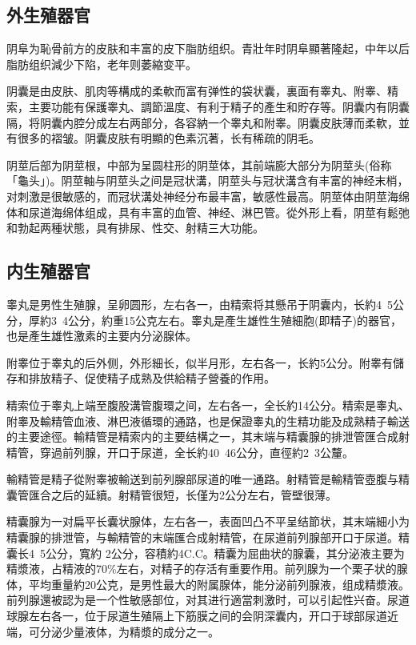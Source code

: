 \documentclass[12pt,UTF8]{ctexbook}
\begin{document}
\subsection{外生殖器官}

阴阜为恥骨前方的皮肤和丰富的皮下脂肪组织。青壯年时阴阜顯著隆起，中年以后脂肪组织減少下陷，老年则萎縮变平。

阴囊是由皮肤、肌肉等構成的柔軟而富有弹性的袋状囊，裏面有睾丸、附睾、精索，主要功能有保護睾丸、調節溫度、有利于精子的產生和貯存等。阴囊内有阴囊隔，将阴囊内腔分成左右两部分，各容納一个睾丸和附睾。阴囊皮肤薄而柔軟，並有很多的褶皱。阴囊皮肤有明顯的色素沉著，长有稀疏的阴毛。

阴莖后部为阴莖根，中部为呈圆柱形的阴莖体，其前端膨大部分为阴莖头(俗称「龜头」)。阴莖軸与阴莖头之间是冠状溝，阴莖头与冠状溝含有丰富的神经末梢，对刺激是很敏感的，而冠状溝处神经分布最丰富，敏感性最高。阴莖体由阴莖海绵体和尿道海绵体组成，具有丰富的血管、神经、淋巴管。從外形上看，阴莖有鬆弛和勃起两種状態，具有排尿、性交、射精三大功能。

\subsection{内生殖器官}

睾丸是男性生殖腺，呈卵圆形，左右各一，由精索将其懸吊于阴囊内，长約4~5公分，厚約3~4公分，約重15公克左右。睾丸是產生雄性生殖細胞(即精子)的器官，也是產生雄性激素的主要内分泌腺体。

附睾位于睾丸的后外侧，外形細长，似半月形，左右各一，长約5公分。附睾有儲存和排放精子、促使精子成熟及供給精子營養的作用。

精索位于睾丸上端至腹股溝管腹環之间，左右各一，全长約14公分。精索是睾丸、附睾及輸精管血液、淋巴液循環的通路，也是保證睾丸的生精功能及成熟精子輸送的主要途徑。輸精管是精索内的主要结構之一，其末端与精囊腺的排泄管匯合成射精管，穿過前列腺，开口于尿道，全长約40~46公分，直徑約2~3公釐。

輸精管是精子從附睾被輸送到前列腺部尿道的唯一通路。射精管是輸精管壺腹与精囊管匯合之后的延續。射精管很短，长僅为2公分左右，管壁很薄。

精囊腺为一对扁平长囊状腺体，左右各一，表面凹凸不平呈结節状，其末端細小为精囊腺的排泄管，与輸精管的末端匯合成射精管，在尿道前列腺部开口于尿道。精囊长4~5公分，寬約 2公分，容積約4C.C。精囊为屈曲状的腺囊，其分泌液主要为精漿液，占精液的70\%左右，对精子的存活有重要作用。前列腺为一个栗子状的腺体，平均重量約20公克，是男性最大的附属腺体，能分泌前列腺液，组成精漿液。前列腺還被認为是一个性敏感部位，对其进行適當刺激时，可以引起性兴奋。尿道球腺左右各一，位于尿道生殖隔上下筋膜之间的会阴深囊内，开口于球部尿道近端，可分泌少量液体，为精漿的成分之一。
\end{document}
